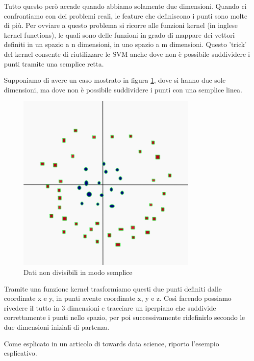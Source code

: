 \documentclass[12pt,italian]{report}
\begin{document}
Tutto questo però accade quando abbiamo solamente due dimensioni. Quando ci confrontiamo con dei problemi reali, le feature che definiscono i punti sono molte di più. Per ovviare a questo problema si ricorre alle funzioni kernel (in inglese kernel functions), le quali sono delle funzioni in grado di mappare dei vettori definiti in un spazio a n dimensioni, in uno spazio a m dimensioni.
Questo 'trick' del kernel consente di riutilizzare le SVM anche dove non è possibile suddividere i punti tramite una semplice retta.

Supponiamo di avere un caso mostrato in figura \ref{fig:svc_non_linear}, dove si hanno due sole dimensioni, ma dove non è possibile suddividere i punti con una semplice linea.

\begin{figure}[h!]
	\center
	\includegraphics[scale=0.6]{../img/svc_non_linear} %
	\caption{Dati non divisibili in modo semplice}
	\label{fig:svc_non_linear}
\end{figure}

Tramite una funzione kernel trasformiamo questi due punti definiti dalle coordinate x e y, in punti avente coordinate x, y e z. Così facendo possiamo rivedere il tutto in 3 dimensioni e tracciare un iperpiano che suddivide correttamente i punti nello spazio, per poi successivamente ridefinirlo secondo le due dimensioni iniziali di partenza.

Come esplicato in un articolo di towards data science, riporto l'esempio esplicativo.
\end{document}
